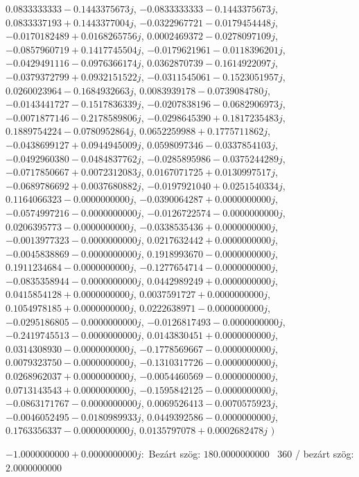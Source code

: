 \documentclass[14pt,a4paper]{article}
\begin{document}
\begin{itemize}
$0.0833333333-0.1443375673j$, $-0.0833333333-0.1443375673j$, $0.0833337193+0.1443377004j$, $-0.0322967721-0.0179454448j$, $-0.0170182489+0.0168265756j$, $0.0002469372-0.0278097109j$, $-0.0857960719+0.1417745504j$, $-0.0179621961-0.0118396201j$, $-0.0429491116-0.0976366174j$, $0.0362870739-0.1614922097j$, $-0.0379372799+0.0932151522j$, $-0.0311545061-0.1523051957j$, $0.0260023964-0.1684932663j$, $0.0083939178-0.0739084780j$, $-0.0143441727-0.1517836339j$, $-0.0207838196-0.0682906973j$, $-0.0071877146-0.2178589806j$, $-0.0298645390+0.1817235483j$, $0.1889754224-0.0780952864j$, $0.0652259988+0.1775711862j$, $-0.0438699127+0.0944945009j$, $0.0598097346-0.0337854103j$, $-0.0492960380-0.0484837762j$, $-0.0285895986-0.0375244289j$, $-0.0717850667+0.0072312083j$, $0.0167071725+0.0130997517j$, $-0.0689786692+0.0037680882j$, $-0.0197921040+0.0251540334j$, $0.1164066323-0.0000000000j$, $-0.0390064287+0.0000000000j$, $-0.0574997216-0.0000000000j$, $-0.0126722574-0.0000000000j$, $0.0206395773-0.0000000000j$, $-0.0338535436+0.0000000000j$, $-0.0013977323-0.0000000000j$, $0.0217632442+0.0000000000j$, $-0.0045838869-0.0000000000j$, $0.1918993670-0.0000000000j$, $0.1911234684-0.0000000000j$, $-0.1277654714-0.0000000000j$, $-0.0835358944-0.0000000000j$, $0.0442989249+0.0000000000j$, $0.0415854128+0.0000000000j$, $0.0037591727+0.0000000000j$, $0.1054978185+0.0000000000j$, $0.0222638971-0.0000000000j$, $-0.0295186805-0.0000000000j$, $-0.0126817493-0.0000000000j$, $-0.2419745513-0.0000000000j$, $0.0143830451+0.0000000000j$, $0.0314308930-0.0000000000j$, $-0.1778569667-0.0000000000j$, $0.0079323750-0.0000000000j$, $-0.1310317726-0.0000000000j$, $0.0268962037+0.0000000000j$, $-0.0054460569-0.0000000000j$, $0.0713143543+0.0000000000j$, $-0.1595842125-0.0000000000j$, $-0.0863171767-0.0000000000j$, $0.0069526413-0.0070575923j$, $-0.0046052495-0.0180989933j$, $0.0449392586-0.0000000000j$, $0.1763356337-0.0000000000j$, $0.0135797078+0.0002682478j$
$\big)$
\end{itemize}
$-1.0000000000+0.0000000000j$:\
Bezárt szög: $180.0000000000$ \
360 / bezárt szög: $2.0000000000$\
\end{document}
